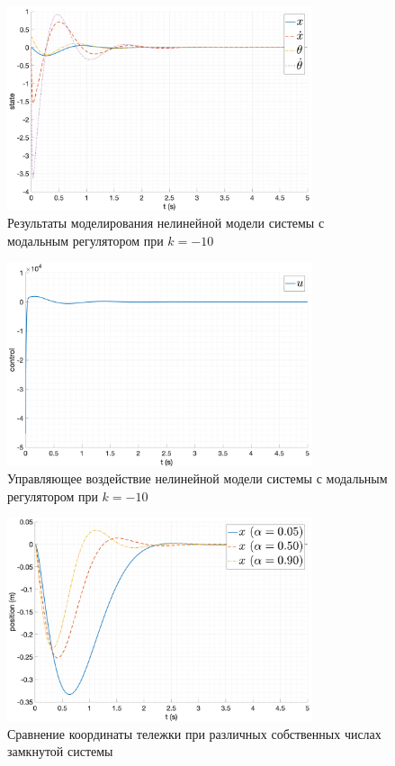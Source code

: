 \begin{figure}[ht!]
    \centering
    \includegraphics[width=0.8\textwidth]{media/plots/modal_controllers/state_4.png}
    \caption{Результаты моделирования нелинейной модели системы с модальным регулятором при $k = -10$}
    \label{fig:modal_controlers_4_out}
\end{figure}
\begin{figure}[ht!]
    \centering
    \includegraphics[width=0.8\textwidth]{media/plots/modal_controllers/u_4.png}
    \caption{Управляющее воздействие нелинейной модели системы с модальным регулятором при $k = -10$}
    \label{fig:modal_controlers_4_u}
\end{figure}
\begin{figure}[ht!]
    \centering
    \includegraphics[width=0.8\textwidth]{media/plots/modal_controllers/x_cmp.png}
    \caption{Сравнение координаты тележки при различных собственных числах замкнутой системы}
    \label{fig:modal_controlers_x_cmp}
\end{figure}
